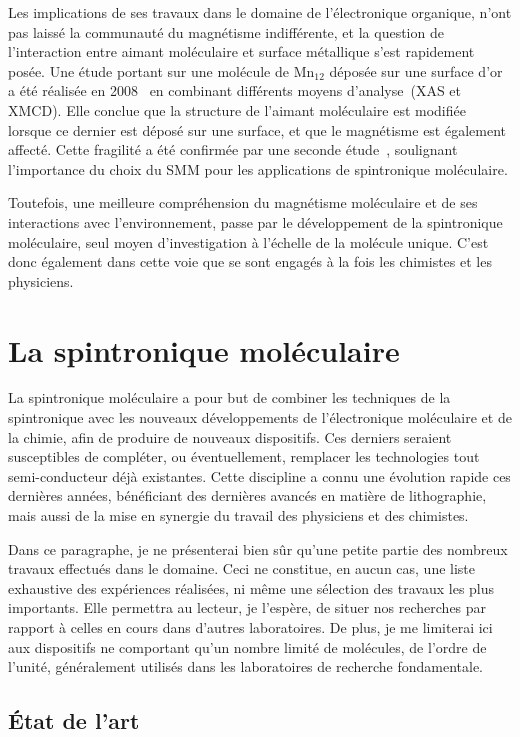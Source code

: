 Les implications de ses travaux dans le domaine de l'électronique organique, n'ont pas laissé la communauté du magnétisme indifférente, et la question de l'interaction entre aimant moléculaire et surface métallique s'est rapidement posée. Une étude portant sur une molécule de Mn$_{12}$ déposée sur une surface d'or a été réalisée en 2008~\cite{Mannini2008} en combinant différents moyens d'analyse~(XAS et XMCD). Elle conclue que la structure de l'aimant moléculaire est modifiée lorsque ce dernier est déposé sur une surface, et que le magnétisme est également affecté. Cette fragilité a été confirmée par une seconde étude~\cite{Mannini2009}, soulignant l'importance du choix du SMM pour les applications de spintronique moléculaire.

Toutefois, une meilleure compréhension du magnétisme moléculaire et de ses interactions avec l’environnement, passe par le développement de la spintronique moléculaire, seul moyen d'investigation à l'échelle de la molécule unique. C'est donc également dans cette voie que se sont engagés à la fois les chimistes et les physiciens.


\section{La spintronique moléculaire}
La spintronique moléculaire a pour but de combiner les techniques de la spintronique avec les nouveaux développements de l'électronique moléculaire et de la chimie, afin de produire de nouveaux dispositifs. Ces derniers seraient susceptibles de compléter, ou éventuellement, remplacer les technologies tout semi-conducteur déjà existantes. Cette discipline a connu une évolution rapide ces dernières années, bénéficiant des dernières avancés en matière de lithographie, mais aussi de la mise en synergie du travail des physiciens et des chimistes. 

Dans ce paragraphe, je ne présenterai bien sûr qu'une petite partie des nombreux travaux effectués dans le domaine. Ceci ne constitue, en aucun cas, une liste exhaustive des expériences réalisées, ni m\^eme une sélection des travaux les plus importants. Elle permettra au lecteur, je l'espère, de situer nos recherches par rapport à celles en cours dans d'autres laboratoires. De plus, je me limiterai ici aux dispositifs ne comportant qu'un nombre limité de molécules, de l'ordre de l'unité, généralement utilisés dans les laboratoires de recherche fondamentale.
\subsection{État de l'art}


